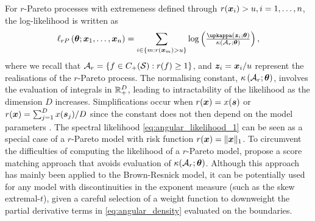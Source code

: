 \documentclass[12pt]{article}
\begin{document}

For $r$-Pareto processes with extremeness defined through $r({\boldsymbol{x}}_i)>u, i=1, \ldots,n$, the log-likelihood is written as
%
\begin{equation}\label{eq:angular_likelihood_3}
\ell_{rP}\left( \bm \theta; \bx_1, \ldots, \bx_n \right) = \sum_{i \in \left\{ m: r(\bx_m) > u \right\}} \log \left( \frac{\upkappa \left(\bz_i; \bm \theta \right)}{\kappa\left( \calA_r; \bm \theta \right)} \right),    
\end{equation}
%
where we recall that ${\mathcal A}_r = \left\{ f \in C_+({\mathcal{S}}): r(f) \geq 1 \right\}$, and ${\boldsymbol{z}}_{i} = {\boldsymbol{x}}_{i}/u$ represent the realisations of the $r$-Pareto process. The normalising constant, $\kappa\left( {\mathcal A}_r; \bm \theta \right)$, involves the evaluation of integrals in ${\mathbb R}_+^D$, leading to intractability of the likelihood as the dimension $D$ increases. Simplifications occur when $r({\boldsymbol{x}}) = x({\boldsymbol{s}})$ or $r({\boldsymbol{x}}) = \sum_{j=1}^D x({\boldsymbol{s}}_j)/D$ since the constant does not then depend on the model parameters
\citep[see][]{deFondeville.Davison:2018, Dombry.etal:2024}. 
The spectral likelihood \eqref{eq:angular_likelihood_1} can be seen as a special case of a $r$-Pareto model with risk function $r({\boldsymbol{x}}) = \| {\boldsymbol{x}} \|_1$. 
%
To circumvent the difficulties of computing the likelihood of a $r$-Pareto model, \citet{deFondeville.Davison:2018} propose a score matching approach that 
avoids
evaluation of $\kappa({\mathcal A}_r;\bm \theta)$. 
Although this approach has mainly been applied to the Brown-Resnick model, it can be potentially used for any model with discontinuities in the exponent measure (such as the skew extremal-$t$), given a careful selection of a weight function to downweight the partial derivative terms in \eqref{eq:angular_density} evaluated on the boundaries.
\end{document}
